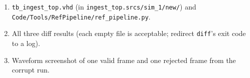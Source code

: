 \documentclass[11pt,letterpaper]{article}
\begin{document}
\begin{tcolorbox}[deliverable={Lab Handout 2-G Deliverable}]
	\begin{enumerate}[leftmargin=1.2em]
		\item \texttt{tb\_ingest\_top.vhd} (in \texttt{ingest\_top.srcs/sim\_1/new/}) and \texttt{Code/Tools/RefPipeline/ref\_pipeline.py}.
		\item All three diff results (each empty file is acceptable; redirect \texttt{diff}'s exit code to a log).
		\item Waveform screenshot of one valid frame and one rejected frame from the corrupt run.
	\end{enumerate}
\end{tcolorbox}

\printhandoutglossary
\end{document}

